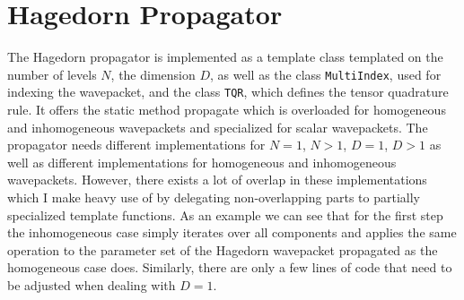 \section{Hagedorn Propagator}
The Hagedorn propagator is implemented as a template class templated on the number of levels $N$, the dimension $D$, as well as the class \texttt{MultiIndex}, used for indexing the wavepacket, and the class \texttt{TQR}, which defines the tensor quadrature rule.
It offers the static method propagate which is overloaded for homogeneous and inhomogeneous wavepackets and specialized for scalar wavepackets. 
The propagator needs different implementations for $N=1$, $N>1$, $D=1$, $D>1$ as well as different implementations for homogeneous and inhomogeneous wavepackets. However, there exists a lot of overlap in these implementations which I make heavy use of by delegating non-overlapping parts to partially specialized template functions. As an example we can see that for the first step the inhomogeneous case simply iterates over all components and applies the same operation to the parameter set of the Hagedorn wavepacket propagated as the homogeneous case does. Similarly, there are only a few lines of code that need to be adjusted when dealing with $D=1$.

